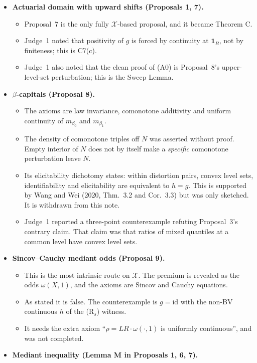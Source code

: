 \begin{itemize}
\begin{itemize}
  \end{itemize}
\item \textbf{Actuarial domain with upward shifts (Proposals 1, 7).}
  \begin{itemize}
  \item Proposal~7 is the only fully $\mathcal X$-based proposal, and it became Theorem C.
  \item Judge~1 noted that positivity of $g$ is forced by continuity at $\mathbf 1_B$, not by finiteness; this is C7(c).
  \item Judge~1 also noted that the clean proof of (A0) is Proposal~8's upper-level-set perturbation; this is the Sweep Lemma.
  \end{itemize}
\item \textbf{$\beta$-capitals (Proposal 8).}
  \begin{itemize}
  \item The axioms are law invariance, comonotone additivity and uniform continuity of $m_{\beta_0}$ and $m_{\beta_1}$.
  \item The density of comonotone triples off $N$ was asserted without proof. Empty interior of $N$ does not by itself make a \emph{specific} comonotone perturbation leave $N$.
  \item Its elicitability dichotomy states: within distortion pairs, convex level sets, identifiability and elicitability are equivalent to $h=g$. This is supported by Wang and Wei (2020, Thm.~3.2 and Cor.~3.3) but was only sketched. It is withdrawn from this note.
  \item Judge~1 reported a three-point counterexample refuting Proposal~3's contrary claim. That claim was that ratios of mixed quantiles at a common level have convex level sets.
  \end{itemize}
\item \textbf{Sincov--Cauchy mediant odds (Proposal 9).}
  \begin{itemize}
  \item This is the most intrinsic route on $\mathcal X$. The premium is revealed as the odds $\omega(X,1)$, and the axioms are Sincov and Cauchy equations.
  \item As stated it is false. The counterexample is $g=\mathrm{id}$ with the non-BV continuous $h$ of the (R$_s$) witness.
  \item It needs the extra axiom ``$\rho=LR\cdot\omega(\cdot,1)$ is uniformly continuous'', and was not completed.
  \end{itemize}
\item \textbf{Mediant inequality (Lemma M in Proposals 1, 6, 7).}

\end{itemize}
